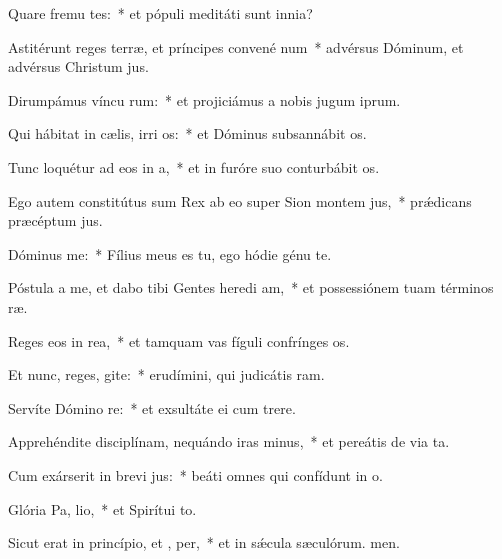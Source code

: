 \item Quare fremu tes:~* et pópuli meditáti sunt innia?
\item Astitérunt reges terræ, et príncipes convené  num~* advérsus Dóminum, et advérsus Christum jus.
\item Dirumpámus víncu rum:~* et projiciámus a nobis jugum iprum.
\item Qui hábitat in cælis, irri os:~* et Dóminus subsannábit os.
\item Tunc loquétur ad eos in  a,~* et in furóre suo conturbábit os.
\item Ego autem constitútus sum Rex ab eo super Sion montem  jus,~* prǽdicans præcéptum jus.
\item Dóminus   me:~* Fílius meus es tu, ego hódie génu te.
\item Póstula a me, et dabo tibi Gentes heredi am,~* et possessiónem tuam términos ræ.
\item Reges eos in  rea,~* et tamquam vas fíguli confrínges os.
\item Et nunc, reges, gite:~* erudímini, qui judicátis ram.
\item Servíte Dómino  re:~* et exsultáte ei cum trere.
\item Apprehéndite disciplínam, nequándo iras minus,~* et pereátis de via ta.
\item Cum exárserit in brevi  jus:~* beáti omnes qui confídunt in o.
\item Glória Pa,  lio,~* et Spirítui to.
\item Sicut erat in princípio, et ,  per,~* et in sǽcula sæculórum. men.
